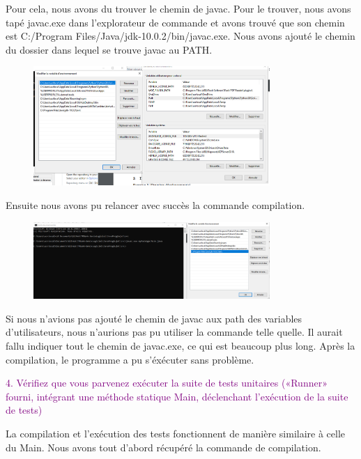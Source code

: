 \documentclass{article}
\begin{document}
Pour cela, nous avons du trouver le chemin de javac. Pour le trouver, nous avons tapé javac.exe dans l'explorateur de commande et avons trouvé que son chemin est C:/Program Files/Java/jdk-10.0.2/bin/javac.exe.
Nous avons ajouté le chemin du dossier dans lequel se trouve javac au PATH.


\begin{figure}[h]
\includegraphics[width=0.8\textwidth]{Annotation 2023-01-10 145746.png}
\end{figure}
Ensuite nous avons pu relancer avec succès la commande compilation.
\begin{figure}[h]
\includegraphics[width=0.8\textwidth]{Annotation 2023-01-10 145813.png}
\end{figure}

Si nous n'avions pas ajouté le chemin de javac aux path des variables d'utilisateurs, nous n'aurions pas pu utiliser la commande telle quelle. Il aurait fallu indiquer tout le chemin de javac.exe, ce qui est beaucoup plus long.
Après la compilation, le programme a pu s'éxécuter sans problème.

\newline
\textcolor{Purple}{4. Vérifiez que vous parvenez exécuter la suite de tests unitaires («Runner» fourni, intégrant
une méthode statique Main, déclenchant l’exécution de la suite de tests)}
\newline

La compilation et l'exécution des tests fonctionnent de manière similaire à celle du Main.
Nous avons tout d'abord récupéré la commande de compilation.
\end{document}
